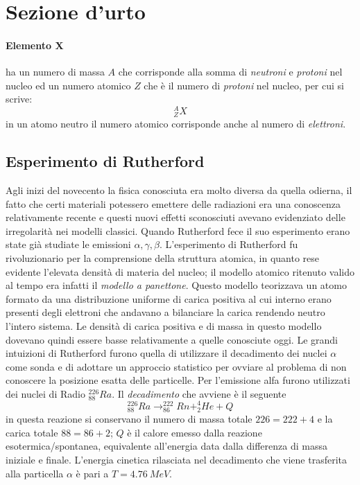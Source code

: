 
\section{Sezione d'urto}

\paragraph{Elemento X} ha un numero di massa $A$ che corrisponde alla somma di \emph{neutroni} e \emph{protoni} nel nucleo ed un numero atomico $Z$ che è il numero di \emph{protoni} nel nucleo, per cui si scrive:
$$^{A}_{Z} X$$
in un atomo neutro il numero atomico corrisponde anche al numero di \emph{elettroni}.


\subsection{Esperimento di Rutherford}
Agli inizi del novecento la fisica conosciuta era molto diversa da quella odierna, il fatto che certi materiali potessero emettere delle radiazioni era una conoscenza relativamente recente e questi nuovi effetti sconosciuti avevano evidenziato delle irregolarità nei modelli classici. 
Quando Rutherford fece il suo esperimento erano state già studiate le emissioni $\alpha,\gamma ,\beta$.
L'esperimento di Rutherford fu rivoluzionario per la comprensione della struttura atomica, in quanto rese evidente l'elevata densità di materia del nucleo; 
il modello atomico ritenuto valido al tempo era infatti il \emph{modello a panettone}.
Questo modello teorizzava un atomo formato da una distribuzione uniforme di carica positiva al cui interno erano presenti degli elettroni che andavano a bilanciare la carica rendendo neutro l'intero sistema.
Le densità di carica positiva e di massa in questo modello dovevano quindi essere basse relativamente a quelle conosciute oggi.
Le grandi intuizioni di Rutherford furono quella di utilizzare il decadimento dei nuclei $\alpha$ come sonda e di adottare un approccio statistico per ovviare al problema di non conoscere la posizione esatta delle particelle.
Per l'emissione alfa furono utilizzati dei nuclei di Radio $^{226}_{88} Ra$.
Il \emph{decadimento} che avviene è il seguente
\begin{equation}
^{226}_{88} Ra \longrightarrow ^{222}_{86}Rn + ^{4}_{2}He + Q
\end{equation}
in questa reazione si conservano il numero di massa totale $ 226 = 222 + 4 $ e la carica totale $ 88 = 86 + 2 $;
$Q$ è il calore emesso dalla reazione esotermica/spontanea, equivalente all'energia data dalla differenza di massa iniziale e finale. 
L'energia cinetica rilasciata nel decadimento che viene trasferita alla particella $\alpha$ è pari a $T = \SI{4.76}{MeV}$.

